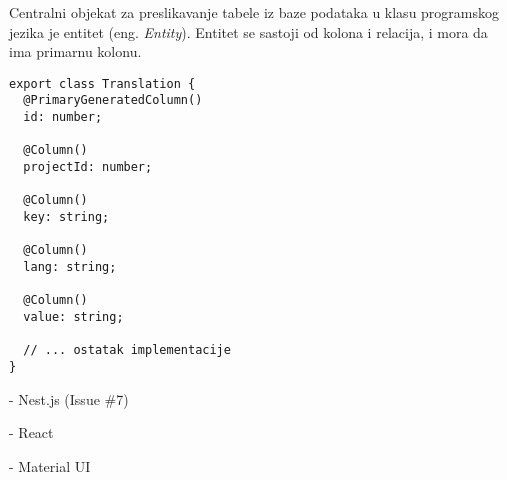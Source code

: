 Centralni objekat za preslikavanje tabele iz baze podataka u klasu programskog jezika je entitet (eng. \textit{Entity}).
Entitet se sastoji od kolona i relacija, i mora da ima primarnu kolonu.

\begin{verbatim}
export class Translation {
  @PrimaryGeneratedColumn()
  id: number;

  @Column()
  projectId: number;

  @Column()
  key: string;

  @Column()
  lang: string;

  @Column()
  value: string;

  // ... ostatak implementacije
}
\end{verbatim}


- Nest.js (Issue \#7)

- React

- Material UI
